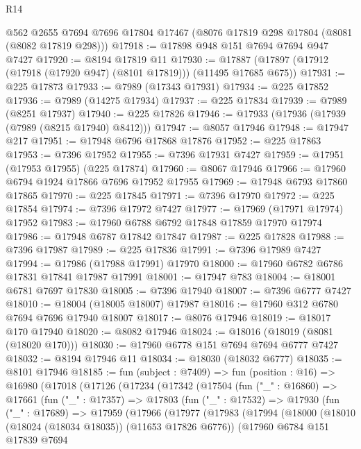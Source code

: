 \begin{lexlean}{R14}
\begin{coremodule}
    @562
    @2655
    @7694
    @7696
    @17804
    @17467
    (@8076 @17819 @298 @17804 (@8081 (@8082 @17819 @298)))
@17918 := @17898 @948 @151 @7694 @7694 @947 @7427
@17920 := @8194 @17819 @11
@17930 := @17887 (@17897 (@17912 (@17918 (@17920 @947) (@8101 @17819))) (@11495 @17685 @675))
@17931 := @225 @17873
@17933 := @7989 (@17343 @17931)
@17934 := @225 @17852
@17936 := @7989 (@14275 @17934)
@17937 := @225 @17834
@17939 := @7989 (@8251 @17937)
@17940 := @225 @17826
@17946 := @17933 (@17936 (@17939 (@7989 (@8215 @17940) @8412)))
@17947 := @8057 @17946
@17948 := @17947 @217
@17951 := @17948 @6796 @17868 @17876
@17952 := @225 @17863
@17953 := @7396 @17952
@17955 := @7396 @17931 @7427
@17959 := @17951 (@17953 @17955) (@225 @17874)
@17960 := @8067 @17946
@17966 := @17960 @6794 @1924 @17866 @7696 @17952 @17955
@17969 := @17948 @6793 @17860 @17865
@17970 := @225 @17845
@17971 := @7396 @17970
@17972 := @225 @17854
@17974 := @7396 @17972 @7427
@17977 := @17969 (@17971 @17974) @17952
@17983 := @17960 @6788 @6792 @17848 @17859 @17970 @17974
@17986 := @17948 @6787 @17842 @17847
@17987 := @225 @17828
@17988 := @7396 @17987
@17989 := @225 @17836
@17991 := @7396 @17989 @7427
@17994 := @17986 (@17988 @17991) @17970
@18000 := @17960 @6782 @6786 @17831 @17841 @17987 @17991
@18001 := @17947 @783
@18004 := @18001 @6781 @7697 @17830
@18005 := @7396 @17940
@18007 := @7396 @6777 @7427
@18010 := @18004 (@18005 @18007) @17987
@18016 := @17960 @312 @6780 @7694 @7696 @17940 @18007
@18017 := @8076 @17946
@18019 := @18017 @170 @17940
@18020 := @8082 @17946
@18024 := @18016 (@18019 (@8081 (@18020 @170)))
@18030 := @17960 @6778 @151 @7694 @7694 @6777 @7427
@18032 := @8194 @17946 @11
@18034 := @18030 (@18032 @6777)
@18035 := @8101 @17946
@18185 := fun (subject : @7409) =>
  fun (position : @16) =>
  @16980
    (@17018
      (@17126
        (@17234
          (@17342
            (@17504
              (fun ("_" : @16860) =>
              @17661
                (fun ("_" : @17357) =>
                @17803
                  (fun ("_" : @17532) =>
                  @17930
                    (fun ("_" : @17689) =>
                    @17959
                      (@17966
                        (@17977
                          (@17983
                            (@17994
                              (@18000
                                (@18010 (@18024 (@18034 @18035)) (@11653 @17826 @6776))
                                (@17960
                                  @6784
                                  @151
                                  @17839
                                  @7694

\end{coremodule}
\end{lexlean}
